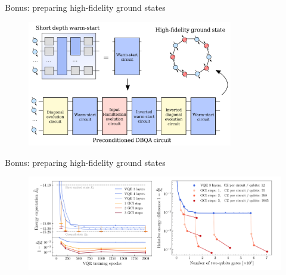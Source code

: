 \documentclass[aspectratio=169, 8pt, xcolor={svgnames}, hyperref={linkcolor=black}]{beamer}
\begin{document}
\begin{frame}{Bonus: preparing high-fidelity ground states}
\begin{figure}  
   \includegraphics[width=0.8\textwidth]{figures/boostvqe.png}
\end{figure}
\end{frame}

\begin{frame}{Bonus: preparing high-fidelity ground states}
\begin{figure}  
   \includegraphics[width=1\textwidth]{figures/gs.png}%
\end{figure}
\end{frame}
\end{document}

